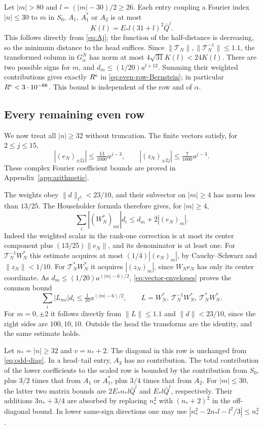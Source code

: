 \documentclass[a4paper,11pt]{article}
\numberwithin{equation}{section}
\theoremstyle{definition}
\theoremstyle{remark}
\newcommand{\norm}[1]{\lVert#1\rVert}
\newcommand{\calT}{\mathcal T}
\begin{document}
Let $|m|>80$ and $l=(|m|-30)/2\ge26$. Each entry coupling a Fourier index $|n|\le30$ to $m$ in $S_0$, $A_1$, $A_1^*$ or $A_2$ is at most
\[
 K(l)=E_*l(31+l)^2\bar Q^l.
\]
This follows directly from \eqref{eq:Aj}; the function of the half-distance is decreasing, so the minimum distance to the head suffices. Since $\norm{\calT_N},\norm{\calT_N^{-1}}\le1.1$, the transformed column in $G_\alpha^N$ has norm at most $4\sqrt{31}K(l)<24K(l)$. There are two possible signs for $m$, and $d_m\le(1/20)a^{l+12}$. Summing their weighted contributions gives exactly $R^{\rm e}$ in \eqref{eq:even-row-Bernstein}; in particular $R^{\rm e}<3\cdot10^{-66}$. This bound is independent of the row and of $\alpha$.

\subsection{Every remaining even row}
We now treat all $|n|\ge32$ without truncation. The finite vectors satisfy, for $2\le j\le15$,
\begin{equation}\label{eq:vector-envelopes}
 |(e_N)_{\pm2j}|\le\tfrac{13}{1000}a^{j-3},\qquad
 |(z_N)_{\pm2j}|\le\tfrac7{1000}a^{j-3}.
\end{equation}
These complex Fourier coefficient bounds are proved in Appendix~\ref{app:arithmetic}.

The weights obey $\norm d_{\ell^2}<23/10$, and their subvector on $|m|\ge4$ has norm less than $13/25$. The Householder formula therefore gives, for $|m|\ge4$,
\[
 \sum_i|(W_N^*)_{mi}|d_i\le d_m+2|(e_N)_m|.
\]
Indeed the weighted scalar in the rank-one correction is at most its center component plus $(13/25)\norm{e_N}$, and its denominator is at least one. For $\calT_N^{-1}W_N^*$ this estimate acquires at most $(1/4)|(e_N)_m|$, by Cauchy--Schwarz and $\norm{z_N}<1/10$. For $\calT_N^*W_N^*$ it acquires $|(z_N)_m|$, since $W_Ne_N$ has only its center coordinate. As $d_m\le(1/20)a^{(|m|-6)/2}$, \eqref{eq:vector-envelopes} proves the common bound
\begin{equation}\label{eq:transform-envelope}
 \sum_i|L_{mi}|d_i\le\tfrac1{10}a^{(|m|-6)/2},
 \qquad L=W_N^*,\ \calT_N^{-1}W_N^*,\ \calT_N^*W_N^*.
\end{equation}
For $m=0,\pm2$ it follows directly from $\norm L\le1.1$ and $\norm d<23/10$, since the right sides are $100,10,10$. Outside the head the transforms are the identity, and the same estimate holds.

Let $n_*=|n|\ge32$ and $v=n_*+2$. The diagonal in this row is unchanged from \eqref{eq:odd-diag}. In a head--tail entry, $A_3$ has no contribution. The total contribution of the lower coefficients to the scaled row is bounded by the contribution from $S_0$, plus $3/2$ times that from $A_1$ or $A_1^*$, plus $3/4$ times that from $A_2$. For $|m|\le30$, the latter two matrix bounds are $2E_*n_*l\bar Q^l$ and $E_*l\bar Q^l$, respectively. Their additions $3n_*+3/4$ are absorbed by replacing $n_*^2$ with $(n_*+2)^2$ in the off-diagonal bound. In lower same-sign directions one may use $|n_*^2-2n_*l-l^2/3|\le n_*^2$.
\end{document}

